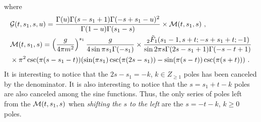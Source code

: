 \documentclass[a4paper,11pt]{article}
\begin{document}
where 
\begin{align}
&{\cal G}(t,s_1,s,u)=\frac{\Gamma (u) \Gamma (s-s_1+1) \Gamma (-s+s_1-u)^2}{\Gamma (1-u) \Gamma (s_1-s)}\times{\cal M}(t,s_1,s) \ ,  \\ 
& {\cal M}(t,s_1,s)=\left(\frac{g}{4\pi m^2}\right)^{s_1}\frac{g}{4\sin \pi s_1 \Gamma(-s_1)}\times  \frac{  \, _2\tilde{F}_1(s_1-1,s+t;-s+s_1+t;-1) }{\sin 2\pi s \Gamma (2 s-s_1+1) \Gamma (-s-t+1)}\nonumber \\ 
&\times \pi ^2\csc (\pi  (s-s_1-t)) (\sin (\pi  s_1) \csc (\pi  (2 s-s_1))-\sin (\pi  (s-t)) \csc (\pi  (s+t))) \ . 
\end{align}
It is interesting to notice that the $2s-s_1=-k$,  $k\in Z_{\ge 1}$ poles has been canceled by the denominator. It is also interesting to notice that the $s=s_1+t-k$ poles are also canceled among the sine functions. Thus, the only series of poles left from the ${\cal M}(t,s_1,s)$ when {\it shifting the $s$ to the left} are the $s=-t-k$, $k\ge 0$ poles.
\end{document}
